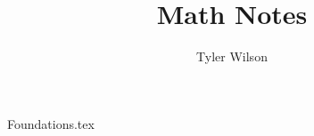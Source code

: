 \documentclass[11pt, fleqn]{article}
\title{Math Notes}
\author{Tyler Wilson}
\date{}
\begin{document}
\allowdisplaybreaks

\maketitle
\tableofcontents

{Foundations.tex}
\end{document}
